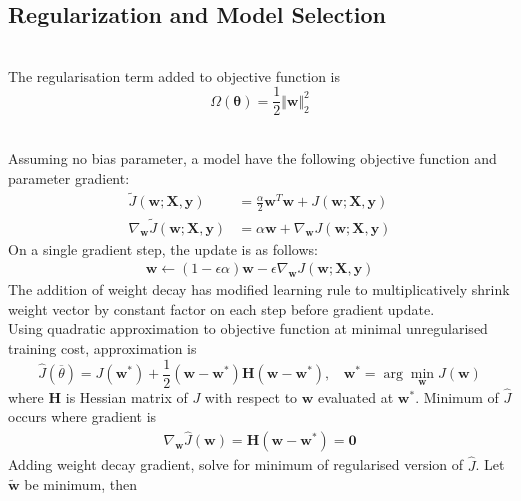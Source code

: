 \subsection{Regularization and Model Selection}

\begin{definition} \\
The regularisation term added to objective function is
\begin{equation*}
\Omega(\bm{\theta}) = \frac{1}{2} \Vert \bm{w} \Vert^2_2 \nonumber
\end{equation*}
\end{definition}

\begin{remark} \\
Assuming no bias parameter, a model have the following objective function and parameter gradient:
\begin{align*}
\tilde{J}(\bm{w}; \bm{X}, \bm{y}) &= \frac{\alpha}{2} \bm{w}^T \bm{w} + J(\bm{w}; \bm{X}, \bm{y}) \nonumber \\
\nabla_{\bm{w}} \tilde{J}(\bm{w}; \bm{X}, \bm{y}) &= \alpha \bm{w} + \nabla_{\bm{w}} J(\bm{w}; \bm{X}, \bm{y}) \nonumber
\end{align*}
On a single gradient step, the update is as follows:
\begin{align*}
\bm{w} \leftarrow (1 - \epsilon \alpha)\bm{w} - \epsilon \nabla_{\bm{w}} J(\bm{w}; \bm{X}, \bm{y}) \nonumber
\end{align*}
The addition of weight decay has modified learning rule to multiplicatively shrink weight vector by constant factor on each step before gradient update.\\
Using quadratic approximation to objective function at minimal unregularised training cost, approximation is
\begin{equation*}
\hat{J}(\overline{\theta}) = J(\bm{w}^*) + \frac{1}{2} (\bm{w} - \bm{w}^*)\bm{H}(\bm{w} - \bm{w}^*), \ \ \ \ \bm{w}^* = \arg \min_{\bm{w}} J(\bm{w}) \nonumber
\end{equation*}
where $\bm{H}$ is Hessian matrix of $J$ with respect to $\bm{w}$ evaluated at $\bm{w}^*$. Minimum of $\hat{J}$ occurs where gradient is
\begin{align}
\nabla_{\bm{w}} \hat{J}(\bm{w}) = \bm{H}(\bm{w} - \bm{w}^*) = \bm{0} \nonumber
\end{align}
Adding weight decay gradient, solve for minimum of regularised version of $\hat{J}$. Let $\tilde{\bm{w}}$ be minimum, then

\end{remark}
